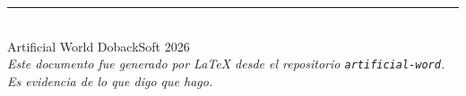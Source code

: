 \documentclass[10pt,a4paper]{article}
\begin{document}
\vfill
\begin{center}
  \color{muted}\small\rule{0.6\linewidth}{0.4pt}\\[4pt]
  Artificial World \textperiodcentered{} DobackSoft \textperiodcentered{} 2026\\
  \textit{Este documento fue generado por \LaTeX{} desde el repositorio
  \texttt{artificial-word}.}\\
  \textit{Es evidencia de lo que digo que hago.}
\end{center}
\end{document}

